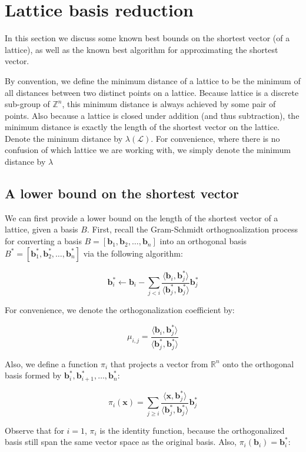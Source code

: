 \section{Lattice basis reduction}
In this section we discuss some known best bounds on the shortest vector (of a lattice), as well as the known best algorithm for approximating the shortest vector.

By convention, we define the minimum distance of a lattice to be the minimum of all distances between two distinct points on a lattice. Because lattice is a discrete sub-group of $\mathbb{Z}^n$, this minimum distance is always achieved by some pair of points. Also because a lattice is closed under addition (and thus subtraction), the minimum distance is exactly the length of the shortest vector on the lattice. Denote the mininum distance by $\lambda(\mathcal{L})$. For convenience, where there is no confusion of which lattice we are working with, we simply denote the minimum distance by $\lambda$

\subsection{A lower bound on the shortest vector}
We can first provide a lower bound on the length of the shortest vector of a lattice, given a basis $B$. First, recall the Gram-Schmidt orthognoalization process for converting a basis $B = [\mathbf{b}_1, \mathbf{b}_2, \ldots, \mathbf{b}_n]$ into an orthogonal basis $B^\ast = [\mathbf{b}_1^\ast, \mathbf{b}_2^\ast, \ldots, \mathbf{b}_n^\ast]$ via the following algorithm:

$$
\mathbf{b}_i^\ast \leftarrow \mathbf{b}_i - \sum_{j<i}\frac{\langle \mathbf{b}_i, \mathbf{b}_j^*\rangle}{\langle \mathbf{b}_j^*, \mathbf{b}_j^*\rangle}\mathbf{b}_j^\ast
$$

For convenience, we denote the orthogonalization coefficient by:

$$
\mu_{i, j} = \frac{\langle \mathbf{b}_i, \mathbf{b}_j^*\rangle}{\langle \mathbf{b}_j^*, \mathbf{b}_j^*\rangle}
$$

Also, we define a function $\pi_i$ that projects a vector from $\mathbb{R}^n$ onto the orthogonal basis formed by $\mathbf{b}_i^\ast, \mathbf{b}_{i+1}^\ast, \ldots, \mathbf{b}_n^\ast$:

$$
\pi_i(\mathbf{x}) = \sum_{j\geq i}\frac{\langle \mathbf{x}, \mathbf{b}_j^\ast\rangle}{\langle \mathbf{b}_j^\ast, \mathbf{b}_j^\ast \rangle}\mathbf{b}_j^\ast
$$

Observe that for $i = 1$, $\pi_i$ is the identity function, because the orthogonalized basis still span the same vector space as the original basis. Also, $\pi_i(\mathbf{b}_i) = \mathbf{b}_i^\ast$:

